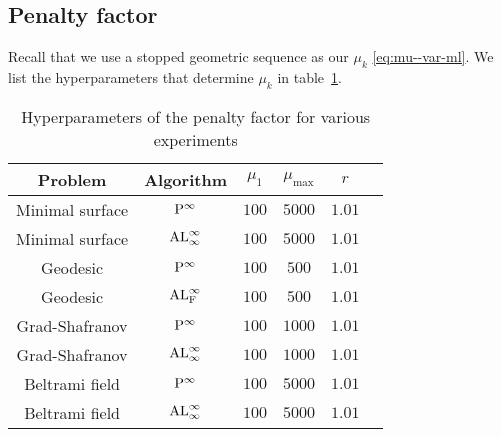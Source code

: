 \subsection{Penalty factor}\label{ssec-mu--var-ml} Recall that we use a stopped geometric sequence as our $\mu_k$ \eqref{eq:mu--var-ml}. We list the hyperparameters that determine $\mu_k$ in table~\ref{tab:mu--var-ml}.
\begin{table}[!ht]
    \begin{center}
    \begin{tabular}{ |c|c|c|c|c|c| } 
     \hline
     Problem & Algorithm& $\mu_1$ & $\mu_{\max}$ &  $r$\\ 
     \hline
     Minimal surface& ${\rm P}^\infty$ & $100$ & $5000$  &$1.01$  \\
     \hline
     Minimal surface &${\rm AL}^\infty_\infty$ & $100$ & $5000$  &$1.01$  \\
     \hline
     Geodesic&${\rm P}^\infty$ & $100$ & $500$  &$1.01$  \\
     \hline
     Geodesic &${\rm AL}^\infty_{\rm F}$ & $100$ & $500$  &$1.01$  \\
     \hline
    Grad-Shafranov&${\rm P}^\infty$ & $100$ & $1000$  &$1.01$\\
     \hline
     Grad-Shafranov &${\rm AL}^\infty_\infty$ & $100$ & $1000$  &$1.01$ \\
     \hline
     Beltrami field&${\rm P}^\infty$ & $100$ & $5000$  &$1.01$ \\
     \hline
     Beltrami field &${\rm AL}^\infty_\infty$ & $100$ & $5000$  &$1.01$  \\
     \hline
\end{tabular}
\caption{Hyperparameters of the penalty factor for various experiments}
\label{tab:mu--var-ml}
\end{center}
\end{table}

